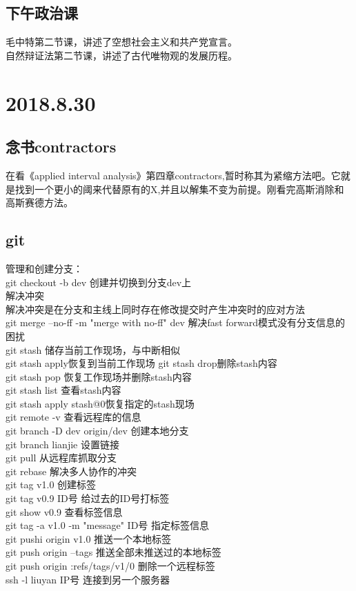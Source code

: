 \documentclass[UTF8]{ctexart}
\begin{document}
\subsection{下午政治课}
毛中特第二节课，讲述了空想社会主义和共产党宣言。\\

自然辩证法第二节课，讲述了古代唯物观的发展历程。\\

\section{2018.8.30}
\subsection{念书contractors}
在看《applied interval analysis》第四章contractors,暂时称其为紧缩方法吧。它就是找到一个更小的阈来代替原有的X,并且以解集不变为前提。刚看完高斯消除和高斯赛德方法。
\subsection{git}
管理和创建分支：\\
git checkout -b dev 创建并切换到分支dev上\\
解决冲突\\
解决冲突是在分支和主线上同时存在修改提交时产生冲突时的应对方法\\
git merge --no-ff -m "merge with no-ff" dev 解决fast forward模式没有分支信息的困扰\\
git stash 储存当前工作现场，与中断相似\\
git stash apply恢复到当前工作现场 git stash drop删除stash内容\\
git stash pop 恢复工作现场并删除stash内容\\
git stash list 查看stash内容\\
git stash apply stash@{0}恢复指定的stash现场\\
git remote -v 查看远程库的信息\\
git branch -D dev origin/dev 创建本地分支\\
git branch lianjie 设置链接\\
git pull 从远程库抓取分支\\
git rebase 解决多人协作的冲突\\
git tag v1.0 创建标签\\
git tag v0.9 ID号 给过去的ID号打标签\\
git show v0.9 查看标签信息\\
git tag -a v1.0 -m "message" ID号  指定标签信息\\
git pushi origin v1.0 推送一个本地标签\\
git push origin --tags 推送全部未推送过的本地标签\\
git push origin :refs/tags/v1/0 删除一个远程标签\\
ssh -l liuyan IP号 连接到另一个服务器\\
\end{document}
